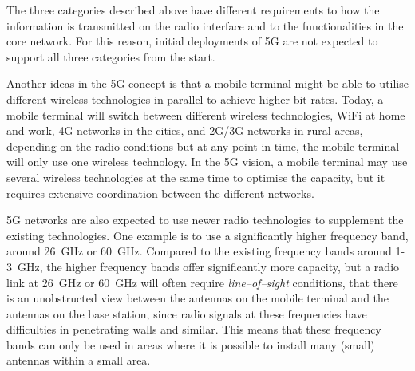 The three categories described above have different requirements to how the information is transmitted on the radio interface and to the functionalities in the core network. For this reason, initial deployments of 5G are not expected to support all three categories from the start.

Another ideas in the 5G concept is that a mobile terminal might be able to utilise different wireless technologies in parallel to achieve higher bit rates. Today, a mobile terminal will switch between different wireless technologies, \ie WiFi at home and work, 4G networks in the cities, and 2G/3G networks in rural areas, depending on the radio conditions but at any point in time, the mobile terminal will only use one wireless technology. In the 5G vision, a mobile terminal may use several wireless technologies at the same time to optimise the capacity, but it requires extensive coordination between the different networks.

5G networks are also expected to use newer radio technologies to supplement the existing technologies. One example is to use a significantly higher frequency band, \eg around 26~GHz or 60~GHz. Compared to the existing frequency bands around 1-3~GHz, the higher frequency bands offer significantly more capacity, but a radio link at 26~GHz or 60~GHz will often require \emph{line--of--sight} conditions, \ie that there is an unobstructed view between the antennas on the mobile terminal and the antennas on the base station, since radio signals at these frequencies have difficulties in penetrating walls and similar. This means that these frequency bands can only be used in areas where it is possible to install many (small) antennas within a small area.


